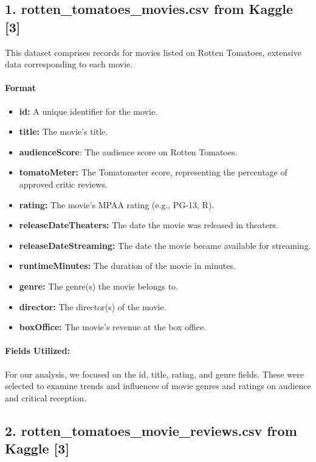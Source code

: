 \documentclass[fontsize=11pt]{article}
\begin{document}
\subsection*{1. \textbf{rotten\_tomatoes\_movies.csv} from Kaggle [3]}

This dataset comprises records for movies listed on Rotten Tomatoes, extensive data corresponding to each movie.

\paragraph{Format}
\begin{itemize}
    \item \textbf{id:} A unique identifier for the movie.
    \item \textbf{title:} The movie's title.
    \item \textbf{audienceScore}: The audience score on Rotten Tomatoes.
    \item \textbf{tomatoMeter:} The Tomatometer score, representing the percentage of approved critic reviews.
    \item \textbf{rating:} The movie’s MPAA rating (e.g., PG-13, R).
    \item \textbf{releaseDateTheaters:} The date the movie was released in theaters.
    \item \textbf{releaseDateStreaming:} The date the movie became available for streaming.
    \item \textbf{runtimeMinutes:} The duration of the movie in minutes.
    \item \textbf{genre:} The genre(s) the movie belongs to.
    \item \textbf{director:} The director(s) of the movie.
    \item \textbf{boxOffice:} The movie's revenue at the box office.
\end{itemize}

\paragraph{Fields Utilized:} For our analysis, we focused on the id, title, rating, and genre fields. These were selected to examine trends and influences of movie genres and ratings on audience and critical reception.

\subsection*{2. \textbf{rotten\_tomatoes\_movie\_reviews.csv} from Kaggle [3]}
\end{document}

